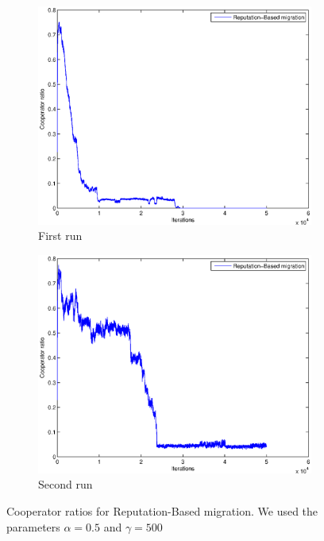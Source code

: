 \documentclass[11pt]{article}
\begin{document}
\begin{figure}[h]
	\centering
	\begin{subfigure}[t]{0.48\textwidth}
        \includegraphics[width=\textwidth]{../../other/plots/convergence-50000.eps}
	\caption{First run}
    	\end{subfigure}
	\begin{subfigure}[t]{0.48\textwidth}
        \includegraphics[width=\textwidth]{../../other/plots/convergence-50000-2.eps}
	\caption{Second run}
    	\end{subfigure}

	\caption{Cooperator ratios for Reputation-Based migration. We used the parameters $\alpha = 0.5$ and $\gamma = 500$}
	\label{fig:convergence_reputation}
\end{figure}
\end{document}
